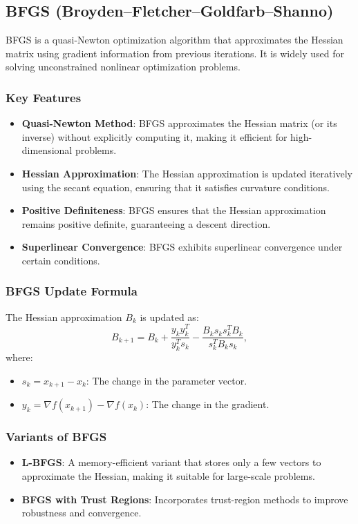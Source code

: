 \begin{notechapter}
\subsection{BFGS (Broyden–Fletcher–Goldfarb–Shanno)}
BFGS is a quasi-Newton optimization algorithm that approximates the Hessian matrix 
using gradient information from previous iterations. It is widely used for solving 
unconstrained nonlinear optimization problems.

\subsubsection{Key Features}
\begin{itemize}
    \item \textbf{Quasi-Newton Method}: BFGS approximates the Hessian matrix (or its 
          inverse) without explicitly computing it, making it efficient for 
          high-dimensional problems.
    \item \textbf{Hessian Approximation}: The Hessian approximation is updated 
          iteratively using the secant equation, ensuring that it satisfies curvature 
          conditions.
    \item \textbf{Positive Definiteness}: BFGS ensures that the Hessian approximation 
          remains positive definite, guaranteeing a descent direction.
    \item \textbf{Superlinear Convergence}: BFGS exhibits superlinear convergence 
          under certain conditions.
\end{itemize}

\subsubsection{BFGS Update Formula}
The Hessian approximation \( B_k \) is updated as:
\[
B_{k+1} = B_k + \frac{y_k y_k^T}{y_k^T s_k} - \frac{B_k s_k s_k^T B_k}{s_k^T B_k s_k},
\]
where:
\begin{itemize}
    \item \( s_k = x_{k+1} - x_k \): The change in the parameter vector.
    \item \( y_k = \nabla f(x_{k+1}) - \nabla f(x_k) \): The change in the gradient.
\end{itemize}

\subsubsection{Variants of BFGS}
\begin{itemize}
    \item \textbf{L-BFGS}: A memory-efficient variant that stores only a few vectors 
          to approximate the Hessian, making it suitable for large-scale problems.
    \item \textbf{BFGS with Trust Regions}: Incorporates trust-region methods to 
          improve robustness and convergence.
\end{itemize}


\end{notechapter}
